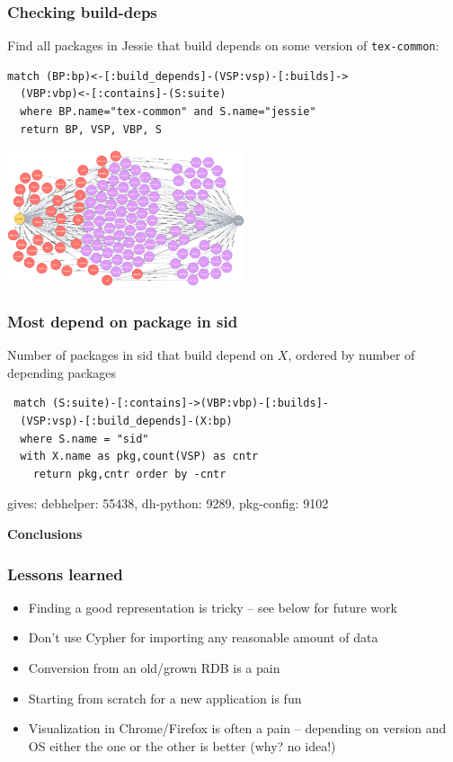 \documentclass[hyperref]{beamer}
\newcommand{\cutin}[1]{%
\begin{frame}[c]\begin{center}{\Large\bf\color{myblue}#1}\end{center}\end{frame}}
\def\bis{\\[\bigskipamount]}
\begin{document}
\begin{frame}[fragile]
  \frametitle{Checking build-deps}

  Find all packages in Jessie that build depends on some version of
  \texttt{tex-common}:

\begin{lstlisting}
match (BP:bp)<-[:build_depends]-(VSP:vsp)-[:builds]->
  (VBP:vbp)<-[:contains]-(S:suite)
  where BP.name="tex-common" and S.name="jessie"
  return BP, VSP, VBP, S
\end{lstlisting}
\pause
\begin{center}
  \includegraphics[height=4cm]{bd-on-tex-common.png}
\end{center}
\end{frame}

\begin{frame}[fragile]
  \frametitle{Most depend on package in sid}
  Number of packages in sid that build depend on $X$, ordered by
  number of depending packages
  \begin{lstlisting}
 match (S:suite)-[:contains]->(VBP:vbp)-[:builds]-
  (VSP:vsp)-[:build_depends]-(X:bp) 
  where S.name = "sid" 
  with X.name as pkg,count(VSP) as cntr 
    return pkg,cntr order by -cntr
\end{lstlisting}
\pause
gives: debhelper: 55438, dh-python: 9289, pkg-config: 9102
\end{frame}

\cutin{Conclusions}

\begin{frame}
  \frametitle{Lessons learned}
  \begin{itemize}
  \item Finding a good representation is tricky -- see below for
    future work\bis
  \item Don't use Cypher for importing any reasonable amount of
    data\bis
  \item Conversion from an old/grown RDB is a pain\bis
  \item Starting from scratch for a new application is fun\bis
  \item Visualization in Chrome/Firefox is often a pain -- depending
    on version and OS either the one or the other is better (why? no
    idea!) 
  \end{itemize}
\end{frame}
\end{document}
